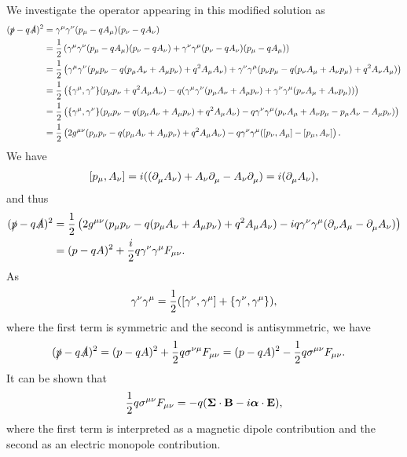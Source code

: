 We investigate the operator appearing in this modified solution as
\begin{align*}
	(\fsl{p} - q\fsl{A})^{2} &= \gamma^{\mu}\gamma^{\nu}(p_{\mu} - qA_{\mu})(p_{\nu} - qA_{\nu}) \\
	                         &= \frac{1}{2}\left(\gamma^{\mu}\gamma^{\nu}(p_{\mu} - qA_{\mu})(p_{\nu} - qA_{\nu}) + \gamma^{\nu}\gamma^{\mu}(p_{\nu} - qA_{\nu})(p_{\mu} - qA_{\mu})\right) \\
	                         &= \frac{1}{2}\left(\gamma^{\mu}\gamma^{\nu}(p_{\mu}p_{\nu} - q(p_{\mu}A_{\nu} + A_{\mu}p_{\nu}) + q^{2}A_{\mu}A_{\nu}) + \gamma^{\nu}\gamma^{\mu}(p_{\nu}p_{\mu} - q(p_{\nu}A_{\mu} + A_{\nu}p_{\mu}) + q^{2}A_{\nu}A_{\mu})\right) \\
	                         &= \frac{1}{2}\left(\acomm{\gamma^{\mu}}{\gamma^{\nu}}(p_{\mu}p_{\nu} + q^{2}A_{\mu}A_{\nu}) - q(\gamma^{\mu}\gamma^{\nu}(p_{\mu}A_{\nu} + A_{\mu}p_{\nu}) + \gamma^{\nu}\gamma^{\mu}(p_{\nu}A_{\mu} + A_{\nu}p_{\mu}))\right) \\
	                         &= \frac{1}{2}\left(\acomm{\gamma^{\mu}}{\gamma^{\nu}}(p_{\mu}p_{\nu} - q(p_{\mu}A_{\nu} + A_{\mu}p_{\nu}) + q^{2}A_{\mu}A_{\nu}) - q\gamma^{\nu}\gamma^{\mu}(p_{\nu}A_{\mu} + A_{\nu}p_{\mu} - p_{\mu}A_{\nu} - A_{\mu}p_{\nu})\right) \\
	                         &= \frac{1}{2}\left(2g^{\mu\nu}(p_{\mu}p_{\nu} - q(p_{\mu}A_{\nu} + A_{\mu}p_{\nu}) + q^{2}A_{\mu}A_{\nu}) - q\gamma^{\nu}\gamma^{\mu}(\comm{p_{\nu}}{A_{\mu}} - \comm{p_{\mu}}{A_{\nu}}\right).
\end{align*}
We have
\begin{align*}
	\comm{p_{\mu}}{A_{\nu}} = i((\del{}{\mu}{A_{\nu}}) + A_{\nu}\del{}{\mu}{} - A_{\nu}\del{}{\mu}{}) = i(\del{}{\mu}{A_{\nu}}),
\end{align*}
and thus
\begin{align*}
	(\slashed{p} - q\slashed{A})^{2} &= \frac{1}{2}\left(2g^{\mu\nu}(p_{\mu}p_{\nu} - q(p_{\mu}A_{\nu} + A_{\mu}p_{\nu}) + q^{2}A_{\mu}A_{\nu}) - iq\gamma^{\nu}\gamma^{\mu}(\partial^{}_{\nu}A_{\mu} - \partial^{}_{\mu}A_{\nu})\right) \\
	                         &= (p - qA)^{2} + \frac{i}{2}q\gamma^{\nu}\gamma^{\mu}F_{\mu\nu}.
\end{align*}
As
\begin{align*}
	\gamma^{\nu}\gamma^{\mu} = \frac{1}{2}(\comm{\gamma^{\nu}}{\gamma^{\mu}} + \acomm{\gamma^{\nu}}{\gamma^{\mu}}),
\end{align*}
where the first term is symmetric and the second is antisymmetric, we have
\begin{align*}
	(\slashed{p} - q\slashed{A})^{2} &= (p - qA)^{2} + \frac{1}{2}q\sigma^{\nu\mu}F_{\mu\nu} = (p - qA)^{2} - \frac{1}{2}q\sigma^{\mu\nu}F_{\mu\nu}.
\end{align*}
It can be shown that
\begin{align*}
	\frac{1}{2}q\sigma^{\mu\nu}F_{\mu\nu} = -q(\vb*{\Sigma}\cdot\vb{B} - i\vb*{\alpha}\cdot\vb{E}),
\end{align*}
where the first term is interpreted as a magnetic dipole contribution and the second as an electric monopole contribution.

